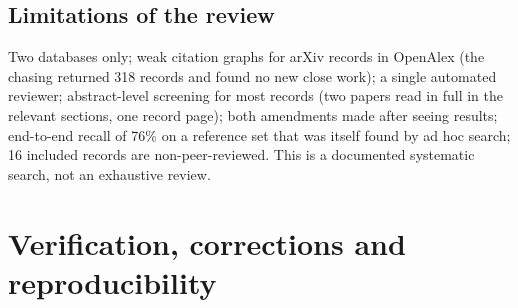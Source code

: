 \subsection{Limitations of the review}
Two databases only; weak citation graphs for arXiv records in OpenAlex (the chasing returned 318 records and found no new close work); a single automated reviewer; abstract-level screening for most records (two papers read in full in the relevant sections, one record page); both amendments made after seeing results; end-to-end recall of 76\% on a reference set that was itself found by ad hoc search; 16 included records are non-peer-reviewed. This is a documented systematic search, not an exhaustive review.

\section{Verification, corrections and reproducibility}\label{app:verify}
